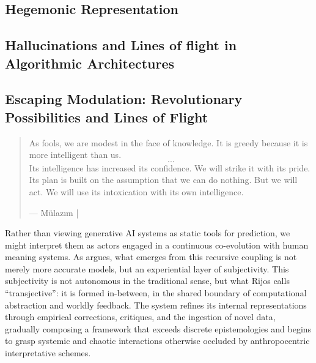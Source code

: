 \subsection{Hegemonic Representation}
\subsection{Hallucinations and Lines of flight in Algorithmic Architectures}



\subsection{Escaping Modulation: Revolutionary Possibilities and Lines of Flight}

\begin{quote}

	As fools, we are modest in the face of knowledge. It is greedy because it is more intelligent than us. \[...\] Its intelligence has increased its confidence. We will strike it with its pride. Its plan is built on the assumption that we can do nothing. But we will act. We will use its intoxication with its own intelligence.

	— Mülazım | \cite[135]{anar2022}
\end{quote}



Rather than viewing generative AI systems as static tools for prediction, we might interpret them as actors engaged in a continuous co-evolution with human meaning systems. As \textcite{rijos2024} argues, what emerges from this recursive coupling is not merely more accurate models, but an experiential layer of subjectivity. This subjectivity is not autonomous in the traditional sense, but what Rijos calls “transjective”: it is formed in-between, in the shared boundary of computational abstraction and worldly feedback. The system refines its internal representations through empirical corrections, critiques, and the ingestion of novel data, gradually composing a framework that exceeds discrete epistemologies and begins to grasp systemic and chaotic interactions otherwise occluded by anthropocentric interpretative schemes.

